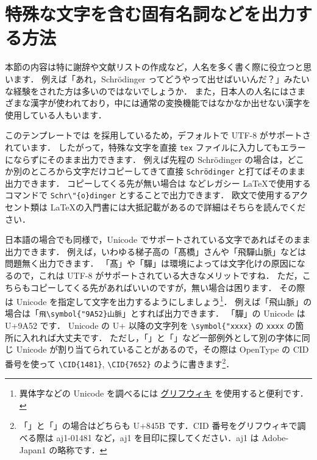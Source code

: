 \section{特殊な文字を含む固有名詞などを出力する方法}
\label{sec:unicode}

本節の内容は特に謝辞や文献リストの作成など，人名を多く書く際に役立つと思います．
例えば「あれ，Schrödinger ってどうやって出せばいいんだ？」みたいな経験をされた方は多いのではないでしょうか．
また，日本人の人名にはさまざまな漢字が使われており，中には通常の変換機能ではなかなか出せない漢字を使用している人もいます．

このテンプレートでは \LuaLaTeX を採用しているため，デフォルトで UTF-8 がサポートされています．
したがって，特殊な文字を直接 \verb|tex| ファイルに入力してもエラーにならずにそのまま出力できます．
例えば先程の Schrödinger の場合は，どこか別のところから文字だけコピーしてきて直接 \verb|Schrödinger| と打てばそのまま出力できます．
コピーしてくる先が無い場合は \pLaTeX などレガシー \LaTeX で使用するコマンドで \verb|Schr\"{o}dinger| とすることで出力できます．
欧文で使用するアクセント類は \LaTeX の入門書には大抵記載があるので詳細はそちらを読んでください．

日本語の場合でも同様で，Unicode でサポートされている文字であればそのまま出力できます．
例えば，いわゆる梯子高の「髙橋」さんや「飛驒山脈」などは問題無く出力できます．
「髙」や「驒」は環境によっては文字化けの原因になるので，これは UTF-8 がサポートされている大きなメリットですね．
ただ，こちらもコピーしてくる先があればいいのですが，無い場合は困ります．
その際は Unicode を指定して文字を出力するようにしましょう\footnote{異体字などの Unicode を調べるには \href{https://glyphwiki.org/wiki/}{グリフウィキ} を使用すると便利です．}．
例えば「飛山脈」の場合は「\verb|飛\symbol{"9A52}山脈|」とすれば出力できます．
「驒」の Unicode は U+9A52 です．
Unicode の U+ 以降の文字列を \verb|\symbol{"xxxx}| の \verb|xxxx| の箇所に入れれば大丈夫です．
ただし，「」と「」など一部例外として別の字体に同じ Unicode が割り当てられていることがあるので，その際は OpenType の CID 番号を使って \verb|\CID{1481}|, \verb|\CID{7652}| のように書きます\footnote{「」と「」の場合はどちらも U+845B です．CID 番号をグリフウィキで調べる際は aj1-01481 など，aj1 を目印に探してください．aj1 は Adobe-Japan1 の略称です．}．



